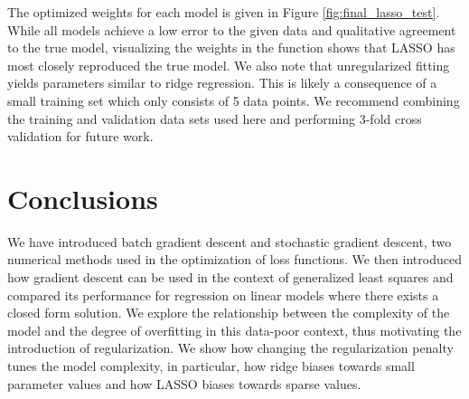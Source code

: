 \documentclass[10pt, twocolumn]{article}
\begin{document}
The optimized weights for each model is given in Figure \ref{fig:final_lasso_test}. While all models achieve a low error to the given data and qualitative agreement to the true model, visualizing the weights in the function shows that LASSO has most closely reproduced the true model. We also note that unregularized fitting yields parameters similar to ridge regression. This is likely a consequence of a small training set which only consists of 5 data points. We recommend combining the training and validation data sets used here and performing 3-fold cross validation for future work.


\section{Conclusions}

We have introduced batch gradient descent and stochastic gradient descent, two numerical methods used in the optimization of loss functions. We then introduced how gradient descent can be used in the context of generalized least squares and compared its performance for regression on linear models where there exists a closed form solution. We explore the relationship between the complexity of the model and the degree of overfitting in this data-poor context, thus motivating the introduction of regularization. We show how changing the regularization penalty tunes the model complexity, in particular, how ridge biases towards small parameter values and how LASSO biases towards sparse values.

 
\end{document}
